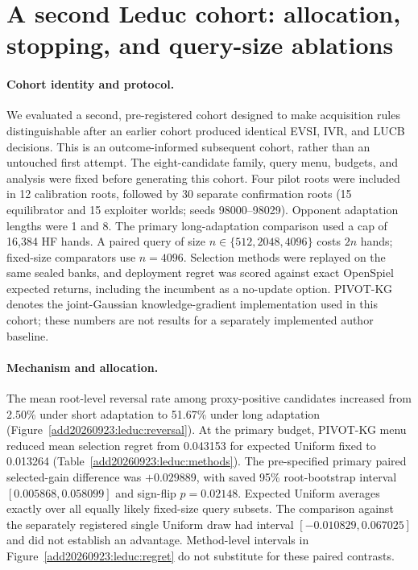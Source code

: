 \section{A second Leduc cohort: allocation, stopping, and query-size ablations}
\label{add20260923:leduc:section}

\paragraph{Cohort identity and protocol.}
We evaluated a second, pre-registered cohort designed to make acquisition rules distinguishable after an earlier cohort produced identical EVSI, IVR, and LUCB decisions. This is an outcome-informed subsequent cohort, rather than an untouched first attempt. The eight-candidate family, query menu, budgets, and analysis were fixed before generating this cohort. Four pilot roots were included in 12 calibration roots, followed by 30 separate confirmation roots (15 equilibrator and 15 exploiter worlds; seeds 98000--98029). Opponent adaptation lengths were 1 and 8. The primary long-adaptation comparison used a cap of 16,384 HF hands. A paired query of size $n\in\{512,2048,4096\}$ costs $2n$ hands; fixed-size comparators use $n=4096$. Selection methods were replayed on the same sealed banks, and deployment regret was scored against exact OpenSpiel expected returns, including the incumbent as a no-update option. PIVOT-KG denotes the joint-Gaussian knowledge-gradient implementation used in this cohort; these numbers are not results for a separately implemented author baseline.

\paragraph{Mechanism and allocation.}
The mean root-level reversal rate among proxy-positive candidates increased from 2.50\% under short adaptation to 51.67\% under long adaptation (Figure~\ref{add20260923:leduc:reversal}). At the primary budget, PIVOT-KG menu reduced mean selection regret from 0.043153 for expected Uniform fixed to 0.013264 (Table~\ref{add20260923:leduc:methods}). The pre-specified primary paired selected-gain difference was $+0.029889$, with saved 95\% root-bootstrap interval $[0.005868,0.058099]$ and sign-flip $p=0.02148$. Expected Uniform averages exactly over all equally likely fixed-size query subsets. The comparison against the separately registered single Uniform draw had interval $[-0.010829,0.067025]$ and did not establish an advantage. Method-level intervals in Figure~\ref{add20260923:leduc:regret} do not substitute for these paired contrasts.


